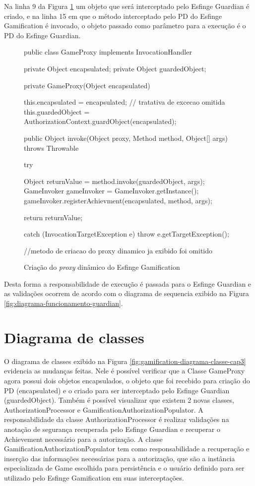 \par Na linha 9 da Figura \ref{fig:esfinge-proxy} um objeto que será interceptado pelo Esfinge Guardian é criado, e na linha 15 em que o método interceptado pelo PD do Esfinge Gamification é invocado, o objeto passado como parâmetro para a execução é o PD do Esfinge Guardian.

\begin{figure}[H]
    \centering
    \caption{Criação do \textit{proxy} dinâmico do Esfinge Gamification}
    \begin{java}
public class GameProxy implements InvocationHandler {

    private Object encapsulated;
	private Object guardedObject; 
    
    private GameProxy(Object encapsulated) {
        this.encapsulated = encapsulated;
    	// tratativa de excecao omitida
    	this.guardedObject = AuthorizationContext.guardObject(encapsulated);
    	
    }

    public Object invoke(Object proxy, Method method, Object[] args) throws Throwable {
    	try {
        	Object returnValue = method.invoke(guardedObject, args);
        	GameInvoker gameInvoker = GameInvoker.getInstance();
        	gameInvoker.registerAchievment(encapsulated, method, args);
    
    	    return returnValue;
    	} catch (InvocationTargetException e) {
    	    throw e.getTargetException();
    	}
    }
    //metodo de criacao do proxy dinamico ja exibido foi omitido
}
    \end{java}
    \label{fig:esfinge-proxy}
\end{figure}

\par Desta forma a responsabilidade de execução é passada para o Esfinge Guardian e as validações ocorrem de acordo com o diagrama de sequencia exibido na Figura \ref{fig:diagrama-funcionamento-guardian}.

\section{Diagrama de classes}

\par O diagrama de classes exibido na Figura \ref{fig:gamification-diagrama-classe-cap3} evidencia as mudanças feitas. Nele é possível verificar que a Classe GameProxy agora possui dois objetos encapsulados, o objeto que foi recebido para criação do PD (encapsulated) e o criado para ser interceptado pelo Esfinge Guardian (guardedObject). Também é possível visualizar que existem 2 novas classes, AuthorizationProcessor e GamificationAuthorizationPopulator. A responsabilidade da classe AuthorizationProcessor é realizar validações na anotação de segurança recuperada pelo Esfinge Guardian e recuperar o Achievement necessário para a autorização. A classe GamificationAuthorizationPopulator tem como responsabilidade a recuperação e inserção das informações necessárias para a autorização, que são a instância especializada de Game escolhida para persistência e o usuário definido para ser utilizado pelo Esfinge Gamification em suas interceptações.


